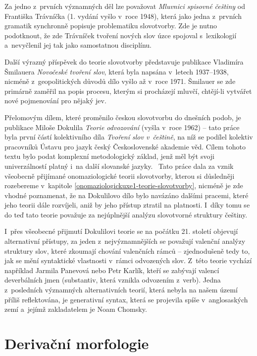 Za jedno z~prvních významných děl lze považovat \emph{Mluvnici spisovné
češtiny} od Františka Trávníčka (1. vydání vyšlo v~roce 1948), která
jako jedna z~prvních gramatik synchronně popisuje problematiku
slovotvorby. Zde je nutno podotknout, že zde Trávníček tvoření nových
slov úzce spojoval s~lexikologií a~nevyčlenil jej tak jako samostatnou
disciplínu.~\parencite[263]{rousinova07}

Další výrazný příspěvek do teorie slovotvorby představuje publikace
Vladimíra Šmilauera \emph{Novočeské tvoření slov}, která byla napsána
v~letech 1937--1938, nicméně z~geopolitických důvodů dílo vyšlo až v~roce
1971. Šmilauer se zde primárně zaměřil na popis procesu, kterým si
procházejí mluvčí, chtějí-li vytvářet nové pojmenování pro nějaký jev.
\parencite[265]{rousinova07}

Přelomovým dílem, které proměnilo českou slovotvorbu do dnešních podob,
je publikace Miloše Dokulila \emph{Teorie odvozování} (vyšla v~roce
1962) -- tato práce byla první částí kolektivního díla \emph{Tvoření
slov v~češtině}, na níž se podílel kolektiv pracovníků Ústavu pro jazyk
český Československé akademie věd. Cílem tohoto textu bylo podat
komplexní metodologický základ, jenž měl být svoji univerzálností platný
i~na další slovanské jazyky.~\parencite[267]{rousinova07} Tato práce
dala za vznik všeobecně přijímané onomaziologické teorii slovotvorby,
kterou si důsledněji rozebereme v~kapitole
\ref{onomaziologickuxe1-teorie-slovotvorby}, nicméně je zde vhodné
poznamenat, že na Dokulilovo dílo bylo navázáno dalšími pracemi, které
jeho teorii dále rozvíjeli, aniž by jeho přístup ztratil na platnosti.
\parencite[272]{rousinova07} I~díky tomu se do teď tato teorie považuje
za nejúplnější analýzu slovotvorné struktury češtiny.
\parencite[273]{zikova07}

I~přes všeobecné přijmutí Dokulilovi teorie se na počátku 21. století
objevují alternativní přístupy, za jeden z~nejvýznamnějších se považují
valenční analýzy struktury slov, které zkoumají chování valenčních rámců
-- zjednodušeně tedy to, jak se mění syntaktické vlastnosti v~rámci
odvozených slov. Z~této teorie vychází například Jarmila Panevová nebo
Petr Karlík, kteří se zabývají valencí deverbálních jmen (substantiv,
která vznikla odvozením z~verb). Jedna z~posledních významných
alternativních teorií, která nebyla na našem území příliš reflektována,
je generativní syntax, která se projevila spíše v~anglosaských zemí
a~jejímž zakladatelem je Noam Chomsky.~\parencite[274--275]{zikova07}

\hypertarget{derivaux10dnuxed-morfologie}{%
\section{Derivační morfologie}\label{derivaux10dnuxed-morfologie}}
